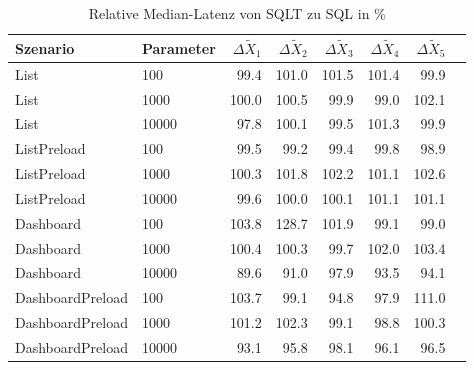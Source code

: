 
\begin{table}[ht]
\setlength{\extrarowheight}{-1pt}
\centering
\caption{Relative Median-Latenz von SQLT zu SQL in \%}
\begin{tabular}{llrrrrrr}
\toprule
Szenario & Parameter & ${\Delta \tilde{X}_1}$ & ${\Delta \tilde{X}_2}$ & ${\Delta \tilde{X}_3}$ & ${\Delta \tilde{X}_4}$ & ${\Delta \tilde{X}_5}$ \\
\midrule
	List & 100 &  99.4 &  101.0 &  101.5 &  101.4 &  99.9 \\
	List & 1000 &  100.0 &  100.5 &  99.9 &  99.0 & \cellcolor{red!11}  102.1 \\
	List & 10000 & \cellcolor{green!11}  97.8 &  100.1 &  99.5 &  101.3 &  99.9 \\
	ListPreload & 100 &  99.5 &  99.2 &  99.4 &  99.8 &  98.9 \\
	ListPreload & 1000 &  100.3 &  101.8 & \cellcolor{red!11}  102.2 &  101.1 & \cellcolor{red!11}  102.6 \\
	ListPreload & 10000 &  99.6 &  100.0 &  100.1 &  101.1 &  101.1 \\
	Dashboard & 100 & \cellcolor{red!12}  103.8 & \cellcolor{red!21}  128.7 &  101.9 &  99.1 &  99.0 \\
	Dashboard & 1000 &  100.4 &  100.3 &  99.7 & \cellcolor{red!11}  102.0 & \cellcolor{red!11}  103.4 \\
	Dashboard & 10000 & \cellcolor{green!14}  89.6 & \cellcolor{green!14}  91.0 & \cellcolor{green!11}  97.9 & \cellcolor{green!13}  93.5 & \cellcolor{green!12}  94.1 \\
	DashboardPreload & 100 & \cellcolor{red!11}  103.7 &  99.1 & \cellcolor{green!12}  94.8 & \cellcolor{green!11}  97.9 & \cellcolor{red!14}  111.0 \\
	DashboardPreload & 1000 &  101.2 & \cellcolor{red!11}  102.3 &  99.1 &  98.8 &  100.3 \\
	DashboardPreload & 10000 & \cellcolor{green!13}  93.1 & \cellcolor{green!12}  95.8 &  98.1 & \cellcolor{green!12}  96.1 & \cellcolor{green!11}  96.5 \\
\bottomrule
\end{tabular}
\label{tab:relativer_durchsatz_sqlt}
\end{table}
	